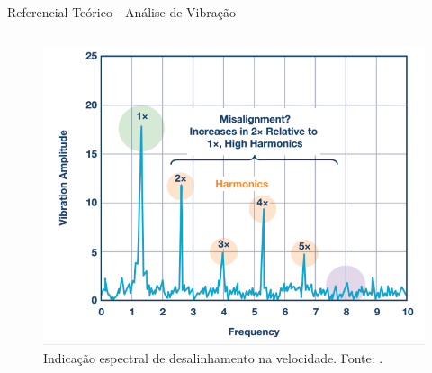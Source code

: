 \documentclass[aspectratio=169]{beamer}
\begin{document}

\begin{frame}{Referencial Teórico - Análise de Vibração}
	\begin{columns}
    	\begin{column}{0.50\textwidth}
			\begin{figure}[HT]
				\begin{center}
					\includegraphics[scale=.25]{../referencial/img/misa_analog_p2.png}
					\caption{Indicação espectral de desalinhamento na velocidade. \newline
					Fonte: .} 
					\label{fig:misa_analog_p2}
				\end{center}
			\end{figure}
     	\end{column}
		

\end{columns}
\end{frame}
\end{document}
